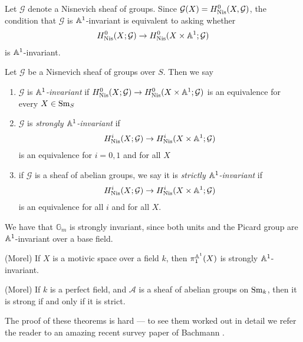 \documentclass[11pt,openany]{book}
\begin{document}
Let $\mathcal{G}$ denote a Nisnevich sheaf of groups. Since $\mathcal{G}(X) = H^0_{\mathrm{Nis}}(X,\mathcal{G})$, the condition that $\mathcal{G}$ is $\mathbb{A}^1$-invariant is equivalent to asking whether
\begin{align*}
    H^0_{\mathrm{Nis}}(X; \mathcal{G}) \to H^0_{\mathrm{Nis}}(X \times \mathbb{A}^1 ; \mathcal{G})
\end{align*}
is $\mathbb{A}^1$-invariant.


\begin{definition} Let $\mathcal{G}$ be a Nisnevich sheaf of groups over $S$. Then we say
\begin{enumerate}
    \item $\mathcal{G}$ is $\mathbb{A}^1$\textit{-invariant} if $H^0_{\mathrm{Nis}}(X; \mathcal{G}) \to H^0_{\mathrm{Nis}}(X \times \mathbb{A}^1 ; \mathcal{G})$ is an equivalence for every $X\in \mathrm{Sm}_S$
    \item $\mathcal{G}$ is \textit{strongly $\mathbb{A}^1$-invariant} if
    \begin{align*}
        H^i_{\mathrm{Nis}}(X; \mathcal{G}) \to H^i_{\mathrm{Nis}}(X \times \mathbb{A}^1; \mathcal{G})
    \end{align*}
    is an equivalence for $i=0,1$ and for all $X$
    \item if $\mathcal{G}$ is a sheaf of abelian groups, we say it is \textit{strictly $\mathbb{A}^1$-invariant} if
    \begin{align*}
        H^i_{\mathrm{Nis}}(X; \mathcal{G}) \to H^i_{\mathrm{Nis}}(X \times \mathbb{A}^1; \mathcal{G})
    \end{align*}
    is an equivalence for all $i$ and for all $X$.
\end{enumerate}
\end{definition}


\begin{example} We have that $\mathbb{G}_m$ is strongly invariant, since both units and the Picard group are $\mathbb{A}^1$-invariant over a base field.
\end{example}

\begin{theorem}\label{thm:pi1-strongly-invt} 
(Morel) If $X$ is a motivic space over a field $k$, then $\pi_1^{\mathbb{A}^1}(X)$ is strongly $\mathbb{A}^1$-invariant.
\end{theorem}

\begin{theorem}\label{thm:strong-strict}
(Morel)
If $k$ is a perfect field, and $\mathcal{A}$ is a sheaf of abelian groups on $\mathrm{Sm}_k$, then it is strong if and only if it is strict.
\end{theorem}

The proof of these theorems is hard --- to see them worked out in detail we refer the reader to an amazing recent survey paper of Bachmann \cite{bachmannstrongly}.
\end{document}
